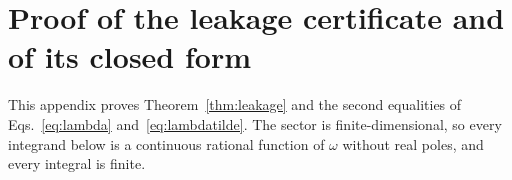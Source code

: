 %
%
%
%
%
%
%
%
%
%
\section{Proof of the leakage certificate and of its closed form}
\label{app:proof}

This appendix proves Theorem~\ref{thm:leakage} and the second equalities of Eqs.~\eqref{eq:lambda}
and~\eqref{eq:lambdatilde}. The sector is finite-dimensional, so every integrand below is a continuous rational
function of $\omega$ without real poles, and every integral is finite.

